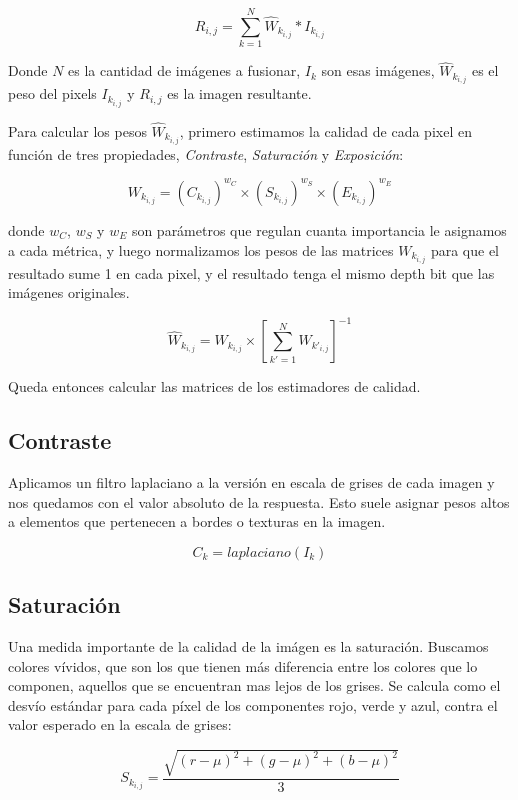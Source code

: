 \documentclass[a4paper,10pt]{article}
\begin{document}
        $$ R_{i,j} = \sum_{k=1}^N{ \hat{W}_{k_{i,j}}*I_{k_{i,j}} } $$

        Donde $N$ es la cantidad de imágenes a fusionar, $I_k$ son esas imágenes, $\hat{W}_{k_{i,j}}$ es el peso del pixels $I_{k_{i,j}}$ y $R_{i,j}$ es la imagen resultante.

        Para calcular los pesos $\hat{W}_{k_{i,j}}$, primero estimamos la calidad de cada pixel en función de tres propiedades, \emph{Contraste}, \emph{Saturación} y \emph{Exposición}:

        $$ W_{k_{i,j}} = (C_{k_{i,j}})^{w_C} \times (S_{k_{i,j}})^{w_S} \times (E_{k_{i,j}})^{w_E} $$

        donde $w_C$, $w_S$ y $w_E$ son parámetros que regulan cuanta importancia le asignamos a cada métrica, y luego normalizamos los pesos de las matrices $W_{k_{i,j}}$ para que el resultado sume 1 en cada pixel, y el resultado tenga el mismo depth bit que las imágenes originales.

        $$ \hat{W}_{k_{i,j}} = W_{k_{i,j}} \times [\sum_{k'=1}^N{W_{k'_{i,j}}}]^{-1} $$ 

        Queda entonces calcular las matrices de los estimadores de calidad.

        \subsection{Contraste}

            Aplicamos un filtro laplaciano a la versión en escala de grises de cada imagen y nos quedamos con el valor absoluto de la respuesta. Esto suele asignar pesos altos a elementos que pertenecen a bordes o texturas en la imagen.

            $$C_k = laplaciano(I_k)$$

        \subsection{Saturación}

            Una medida importante de la calidad de la imágen es la saturación. Buscamos colores vívidos, que son los que tienen más diferencia entre los colores que lo componen, aquellos que se encuentran mas lejos de los grises. Se calcula como el desvío estándar para cada píxel de los componentes rojo, verde y azul, contra el valor esperado en la escala de grises:

            $$ S_{k_{i,j}} = \frac{\sqrt{(r-\mu)^2 + (g-\mu)^2 + (b-\mu)^2}}{3} $$
            
\end{document}
